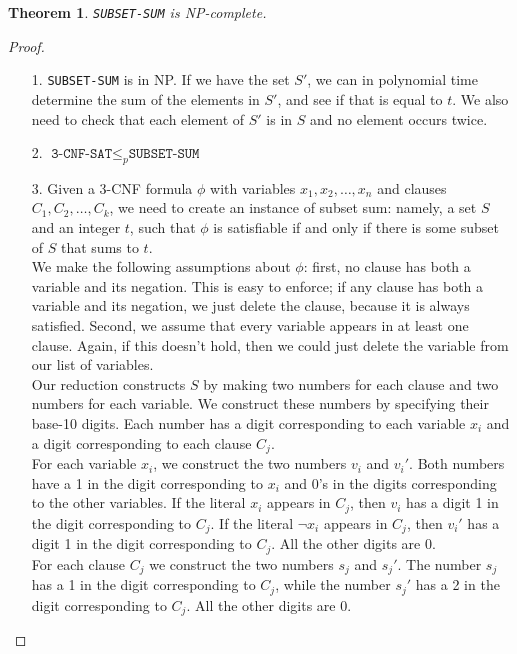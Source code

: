 \documentclass[12pt]{article}
\theoremstyle{plain}
\newtheorem{theorem}{Theorem}[subsection]
\theoremstyle{definition}
\begin{document}
\begin{theorem}
\texttt{SUBSET-SUM} is NP-complete.
\end{theorem}
\begin{proof}
\begin{enumerate}
  \item[1.] \texttt{SUBSET-SUM} is in NP.
  If we have the set $S'$, we can in polynomial time determine the sum of the elements in $S'$, and see if that is equal to $t$.
  We also need to check that each element of $S'$ is in $S$ and no element occurs twice.

  \item[2.] $\texttt{3-CNF-SAT} \leq_{p} \texttt{SUBSET-SUM}$

  \item[3.] Given a 3-CNF formula $\phi$ with variables $x_{1}, x_{2}, \dots, x_{n}$ and clauses $C_{1}, C_{2}, \dots, C_{k}$, we need to create an instance of subset sum: namely, a set $S$ and an integer $t$, such that $\phi$ is satisfiable if and only if there is some subset of $S$ that sums to $t$. \\

  We make the following assumptions about $\phi$: first, no clause has both a variable and its negation.
  This is easy to enforce;
  if any clause has both a variable and its negation, we just delete the clause, because it is always satisfied.
  Second, we assume that every variable appears in at least one clause.
  Again, if this doesn't hold, then we could just delete the variable from our list of variables. \\

  Our reduction constructs $S$ by making two numbers for each clause and two numbers for each variable.
  We construct these numbers by specifying their base-10 digits.
  Each number has a digit corresponding to each variable $x_{i}$ and a digit corresponding to each clause $C_{j}$. \\

  For each variable $x_{i}$, we construct the two numbers $v_{i}$ and $v_{i}'$.
  Both numbers have a 1 in the digit corresponding to $x_{i}$ and 0's in the digits corresponding to the other variables.
  If the literal $x_{i}$ appears in $C_{j}$, then $v_{i}$ has a digit 1 in the digit corresponding to $C_{j}$.
  If the literal $\neg x_{i}$ appears in $C_{j}$, then $v_{i}'$ has a digit 1 in the digit corresponding to $C_{j}$.
  All the other digits are 0. \\

  For each clause $C_{j}$ we construct the two numbers $s_{j}$ and $s_{j}'$.
  The number $s_{j}$ has a 1 in the digit corresponding to $C_{j}$, while the number $s_{j}'$ has a 2 in the digit corresponding to $C_{j}$.
  All the other digits are 0. \\


\end{enumerate}
\end{proof}
\end{document}
